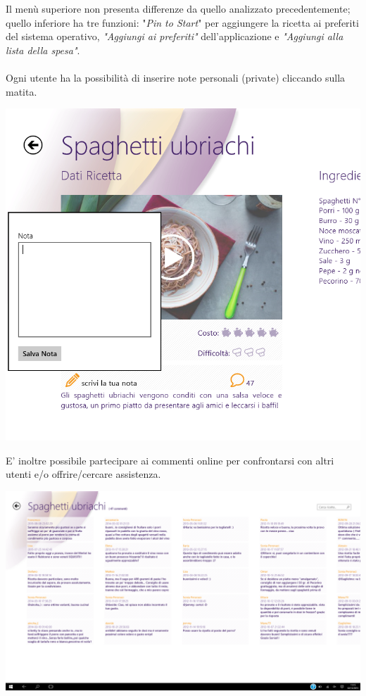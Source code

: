 Il menù superiore non presenta differenze da quello analizzato precedentemente; quello inferiore ha tre funzioni: "\textit{Pin to Start}" per aggiungere la ricetta ai preferiti del sistema operativo, \textit{"Aggiungi ai preferiti"} dell'applicazione e \textit{"Aggiungi alla lista della spesa"}.\\\\
\newpage
Ogni utente ha la possibilità di inserire note personali (private) cliccando sulla matita.

\begin{center}
\includegraphics[scale=0.4] {img/Giallozafferano/ricetta_nota.png}  
\end{center}

E' inoltre possibile partecipare ai commenti online per confrontarsi con altri utenti e/o offrire/cercare assistenza.

\begin{center}
\includegraphics[scale=0.275] {img/Giallozafferano/ricetta_commenti.png}  
\end{center}

